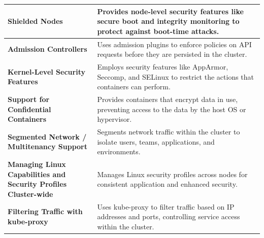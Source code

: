 \begin{longtable}{p{0.35\linewidth} p{0.65\linewidth}}
\hline
\textbf{Shielded Nodes} & Provides node-level security features like secure boot and integrity monitoring to protect against boot-time attacks. \\
\hline
\textbf{Admission Controllers} & Uses admission plugins to enforce policies on API requests before they are persisted in the cluster. \\
\hline
\textbf{Kernel-Level Security Features} & Employs security features like AppArmor, Seccomp, and SELinux to restrict the actions that containers can perform. \\
\hline
\textbf{Support for Confidential Containers} & Provides containers that encrypt data in use, preventing access to the data by the host OS or hypervisor. \\
\hline
\textbf{Segmented Network / Multitenancy Support} & Segments network traffic within the cluster to isolate users, teams, applications, and environments. \\
\hline
\textbf{Managing Linux Capabilities and Security Profiles Cluster-wide} & Manages Linux security profiles across nodes for consistent application and enhanced security. \\
\hline
\textbf{Filtering Traffic with kube-proxy} & Uses kube-proxy to filter traffic based on IP addresses and ports, controlling service access within the cluster. \\

\end{longtable}


